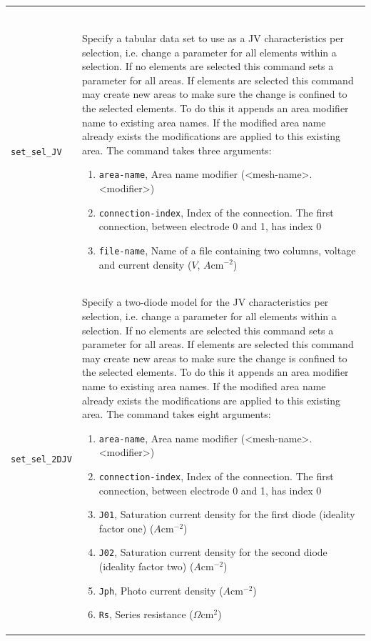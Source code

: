 \documentclass[noshowpacs,preprintnumbers,amsmath,amssymb, letter]{revtex4}
\begin{document}
\begin{longtable}{p{}p{}}
\begin{enumerate}
\end{enumerate}\\
\texttt{set\_sel\_JV}	&  Specify a tabular data set to use as a JV characteristics per selection, i.e. change a parameter for all elements within a selection. If no elements are selected this command sets a parameter for all areas. If elements are selected this command may create new areas to make sure the change is confined to the selected elements. To do this it appends an area modifier name to existing area names. If the modified area name already exists the modifications are applied to this existing area. The command takes three arguments:
\begin{enumerate}
\item \texttt{area-name}, Area name modifier (\textless mesh-name\textgreater .\textless modifier\textgreater )
\item \texttt{connection-index}, Index of the connection. The first connection, between electrode 0 and 1,  has index 0
\item \texttt{file-name}, Name of a file containing two columns, voltage and current density ($V$, $A \text{cm}^{-2}$)
\end{enumerate}\\
\texttt{set\_sel\_2DJV}	&  Specify a two-diode model for the JV characteristics per selection, i.e. change a parameter for all elements within a selection. If no elements are selected this command sets a parameter for all areas. If elements are selected this command may create new areas to make sure the change is confined to the selected elements. To do this it appends an area modifier name to existing area names. If the modified area name already exists the modifications are applied to this existing area. The command takes eight arguments:
\begin{enumerate}
\item \texttt{area-name}, Area name modifier (\textless mesh-name\textgreater .\textless modifier\textgreater )
\item \texttt{connection-index}, Index of the connection. The first connection, between electrode 0 and 1,  has index 0
\item \texttt{J01}, Saturation current density for the first diode (ideality factor one)  ($A \text{cm}^{-2}$)
\item \texttt{J02}, Saturation current density for the second diode (ideality factor two)  ($A \text{cm}^{-2}$)
\item \texttt{Jph}, Photo current density ($A \text{cm}^{-2}$)
\item \texttt{Rs}, Series resistance ($\Omega \text{cm}^2$)

\end{enumerate}
\end{longtable}
\end{document}
